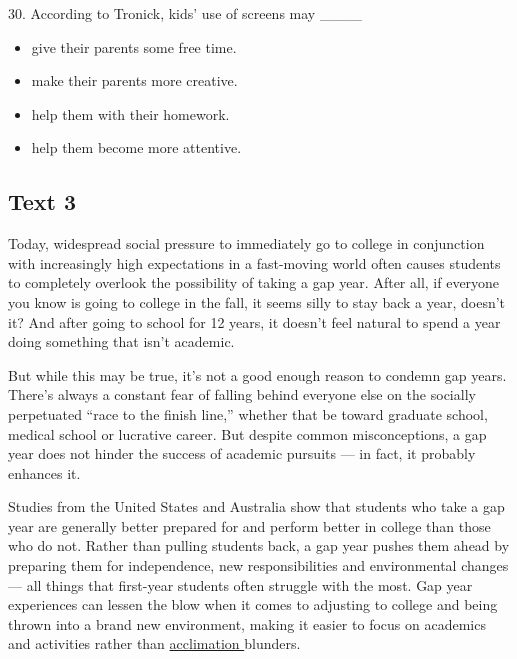 \documentclass[UTF8,11pt]{ctexart}
\begin{document}
30. According to Tronick, kids’ use of screens may \_\_\_\_


\begin{itemize}[leftmargin=2em,itemsep=.2em,topsep=.4em]\item[A.] give their parents some free time.
\item[B.] make their parents more creative.
\item[C.] help them with their homework.
\item[D.] help them become more attentive.
\end{itemize}

\subsection*{\textbf{Text 3}}


Today, widespread social pressure to immediately go to college in conjunction with increasingly high expectations in a fast-moving world often causes students to completely overlook the possibility of taking a gap year. After all, if everyone you know is going to college in the fall, it seems silly to stay back a year, doesn’t it? And after going to school for 12 years, it doesn’t feel natural to spend a year doing something that isn’t academic.


But while this may be true, it’s not a good enough reason to condemn gap years. There’s always a constant fear of falling behind everyone else on the socially perpetuated “race to the finish line,” whether that be toward graduate school, medical school or lucrative career. But despite common misconceptions, a gap year does not hinder the success of academic pursuits — in fact, it probably enhances it.


Studies from the United States and Australia show that students who take a gap year are generally better prepared for and perform better in college than those who do not. Rather than pulling students back, a gap year pushes them ahead by preparing them for independence, new responsibilities and environmental changes — all things that first-year students often struggle with the most. Gap year experiences can lessen the blow when it comes to adjusting to college and being thrown into a brand new environment, making it easier to focus on academics and activities rather than \uline{acclimation }blunders.
\end{document}
